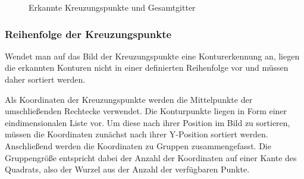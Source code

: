 \begin{figure}[h!]
    \hfill
    \caption{Erkannte Kreuzungspunkte und Gesamtgitter}
\end{figure}


\subsubsection{Reihenfolge der Kreuzungspunkte}
Wendet man auf das Bild der Kreuzungspunkte eine Konturerkennung an, liegen die erkannten Konturen nicht in einer definierten Reihenfolge vor und müssen daher sortiert werden.

Als Koordinaten der Kreuzungspunkte werden die Mittelpunkte der umschließenden Rechtecke verwendet.
Die Konturpunkte liegen in Form einer eindimensionalen Liste vor. Um diese nach ihrer Position im Bild zu sortieren, müssen die Koordinaten zunächst nach ihrer Y-Position sortiert werden.
Anschließend werden die Koordinaten zu Gruppen zusammengefasst.
Die Gruppengröße entspricht dabei der Anzahl der Koordinaten auf einer Kante des Quadrats, also der Wurzel aus der Anzahl der verfügbaren Punkte.

